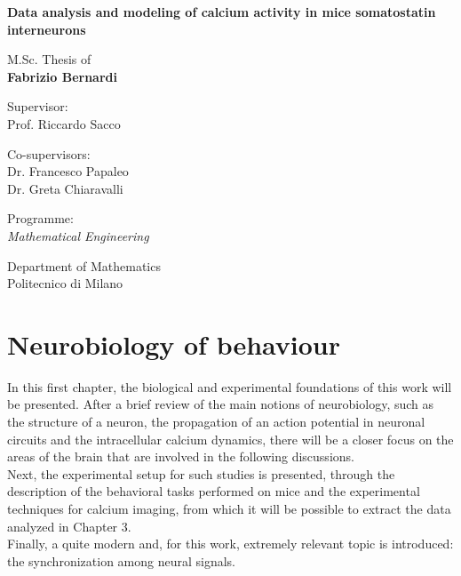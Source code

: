 \documentclass[12pt, a4paper]{article}
\newcommand{\myName}{Fabrizio Bernardi}
\newcommand{\myTitle}{Data analysis and modeling of calcium activity in   mice somatostatin interneurons}
\newcommand{\myDegree}{Programme: \protect\\ \textit{Mathematical Engineering}}
\newcommand{\myDepartment}{Department of Mathematics}
\newcommand{\myUni}{Politecnico di Milano}
\begin{document}
\begin{titlepage}
\begin{minipage}{\linewidth}
\begin{minipage}{0.45\linewidth}
\begin{figure}[H]
				\end{figure}
			\end{minipage}
		\end{minipage}
		
		\begin{addmargin}[1cm]{-1cm}
			\setlength{\parindent}{0pt}
			\vfill
			
			{\huge\bfseries\myTitle}
			
			\vspace{2cm}
			
			{\Large M.Sc. Thesis of\\[0.125cm]}
			{\LARGE\bfseries\myName}
			
			\vspace{1cm}
			
			\large
			Supervisor:\\[0.125cm]
			{\Large Prof. Riccardo Sacco}
			
			\vspace{0.5cm}
			
			\large
			Co-supervisors:\\[0.125cm]
			{\Large Dr. Francesco Papaleo \\
			Dr. Greta Chiaravalli}
			
			\vspace{2cm}
			
			\myDegree
			
			\vspace{0.5cm}
			
			\myDepartment \\
			\myUni
			
			\vfill
		\end{addmargin}
	\end{titlepage}
	
	\tableofcontents
	
	\newpage
	
	\section{Neurobiology of behaviour} \label{section 1.1}
	
	
	In this first chapter, the biological and experimental foundations of this work will be presented. After a brief review of the main notions of neurobiology, such as the structure of a neuron, the propagation of an action potential in neuronal circuits and the intracellular calcium dynamics, there will be a closer focus on the areas of the brain that are involved in the following discussions.\\
	Next, the experimental setup for such studies is presented, through the description of the behavioral tasks performed on mice and the experimental techniques for calcium imaging, from which it will be possible to extract the data analyzed in Chapter 3.\\
	Finally, a quite modern and, for this work, extremely relevant topic is introduced: the synchronization among neural signals.
	
\end{document}
